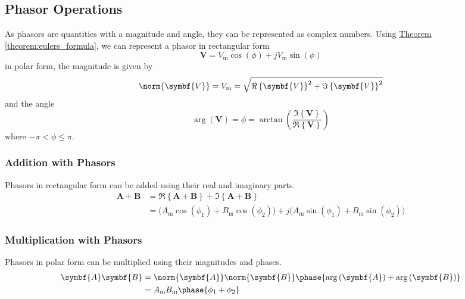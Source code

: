 \documentclass{article}
\begin{document}
\subsection{Phasor Operations}
As phasors are quantities with a magnitude and angle, they can be represented as complex numbers.
Using \hyperref[theorem:eulers_formula]{Theorem \ref{theorem:eulers_formula}}, we can represent a phasor in rectangular form
\begin{equation*}
    \symbf{V} = V_{\mathrm{m}} \cos{\left( \phi \right)} + j V_{\mathrm{m}} \sin{\left( \phi \right)}
\end{equation*}
in polar form, the magnitude is given by
\begin{equation*}
    \norm{\symbf{V}} = V_{\mathrm{m}} = \sqrt{\Re\left\{ \symbf{V} \right\}^2 + \Im\left\{ \symbf{V} \right\}^2}
\end{equation*}
and the angle
\begin{equation*}
    \arg{\left( \symbf{V} \right)} = \phi = \arctan{\left( \frac{\Im\left\{ \symbf{V} \right\}}{\Re\left\{ \symbf{V} \right\}} \right)}
\end{equation*}
where $-\pi < \phi \leq \pi$.
\subsubsection{Addition with Phasors}
Phasors in rectangular form can be added using their real and imaginary parts.
\begin{align*}
    \symbf{A} + \symbf{B} & = \Re\left\{ \symbf{A} + \symbf{B} \right\} + \Im\left\{ \symbf{A} + \symbf{B} \right\}                                                                                                                      \\
                          & = \bigl( A_{\mathrm{m}}\cos{\left( \phi_1 \right)} + B_{\mathrm{m}}\cos{\left( \phi_2 \right)} \bigr) + j\bigl( A_{\mathrm{m}}\sin{\left( \phi_1 \right)} + B_{\mathrm{m}}\sin{\left( \phi_2 \right)} \bigr)
\end{align*}
\subsubsection{Multiplication with Phasors}
Phasors in polar form can be multiplied using their magnitudes and phases.
\begin{align*}
    \symbf{A} \symbf{B} & = \norm{\symbf{A}} \norm{\symbf{B}} \phase{\arg{\left( \symbf{A} \right)} + \arg{\left( \symbf{B} \right)}} \\
                        & = A_{\mathrm{m}} B_{\mathrm{m}} \phase{\phi_1 + \phi_2}
\end{align*}
\end{document}

